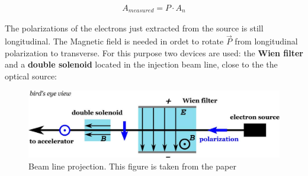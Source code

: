 \begin{align*}
A_{measured} = P \cdot A_{n}
\end{align*}

The polarizations of the electrons just extracted from the source is still longitudinal. The Magnetic field is needed in ordet to rotate $\vec{P}$ from longitudinal polarization to transverse. For this purpose two devices are used: the \textbf{Wien filter} and a \textbf{double solenoid} located in the injection beam line, close to the the optical source: 

\begin{figure}[hbtp]
\centering
\includegraphics[width = \textwidth]{ExperimentalSetup/injection.png}
\caption{Beam line projection. This figure is taken from the paper \cite{Schlimme:2016rrp}}
\end{figure}

